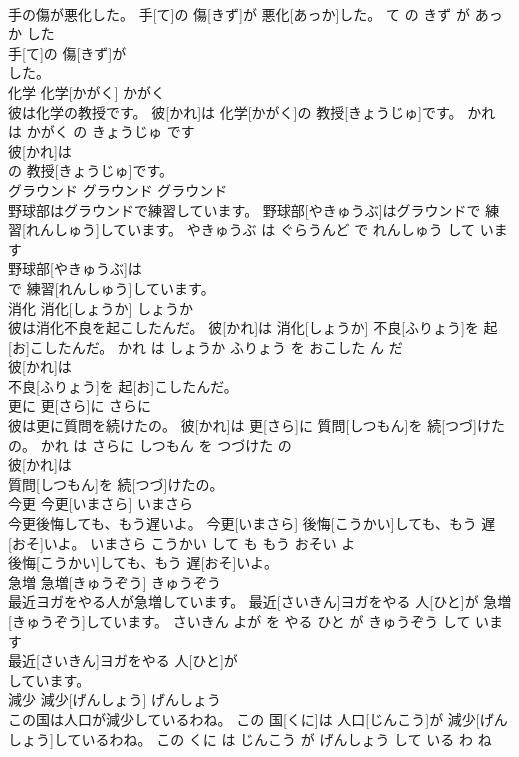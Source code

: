 \documentclass[8pt]{extreport}
\begin{document}
\begin{CJK}{UTF8}{min}
\\	手の傷が悪化した。	手[て]の 傷[きず]が 悪化[あっか]した。	て の きず が あっか した	
\\	手[て]の 傷[きず]が
\\	した。			
\\	化学	化学[かがく]	かがく	
\\	彼は化学の教授です。	彼[かれ]は 化学[かがく]の 教授[きょうじゅ]です。	かれ は かがく の きょうじゅ です	
\\	彼[かれ]は
\\	の 教授[きょうじゅ]です。			
\\	グラウンド	グラウンド	グラウンド	
\\	野球部はグラウンドで練習しています。	野球部[やきゅうぶ]はグラウンドで 練習[れんしゅう]しています。	やきゅうぶ は ぐらうんど で れんしゅう して います	
\\	野球部[やきゅうぶ]は
\\	で 練習[れんしゅう]しています。			
\\	消化	消化[しょうか]	しょうか	
\\	彼は消化不良を起こしたんだ。	彼[かれ]は 消化[しょうか] 不良[ふりょう]を 起[お]こしたんだ。	かれ は しょうか ふりょう を おこした ん だ	
\\	彼[かれ]は
\\	不良[ふりょう]を 起[お]こしたんだ。			
\\	更に	更[さら]に	さらに	
\\	彼は更に質問を続けたの。	彼[かれ]は 更[さら]に 質問[しつもん]を 続[つづ]けたの。	かれ は さらに しつもん を つづけた の	
\\	彼[かれ]は
\\	質問[しつもん]を 続[つづ]けたの。			
\\	今更	今更[いまさら]	いまさら	
\\	今更後悔しても、もう遅いよ。	今更[いまさら] 後悔[こうかい]しても、もう 遅[おそ]いよ。	いまさら こうかい して も もう おそい よ	
\\	後悔[こうかい]しても、もう 遅[おそ]いよ。			
\\	急増	急増[きゅうぞう]	きゅうぞう	
\\	最近ヨガをやる人が急増しています。	最近[さいきん]ヨガをやる 人[ひと]が 急増[きゅうぞう]しています。	さいきん よが を やる ひと が きゅうぞう して います	
\\	最近[さいきん]ヨガをやる 人[ひと]が
\\	しています。			
\\	減少	減少[げんしょう]	げんしょう	
\\	この国は人口が減少しているわね。	この 国[くに]は 人口[じんこう]が 減少[げんしょう]しているわね。	この くに は じんこう が げんしょう して いる わ ね	

\end{CJK}
\end{document}
